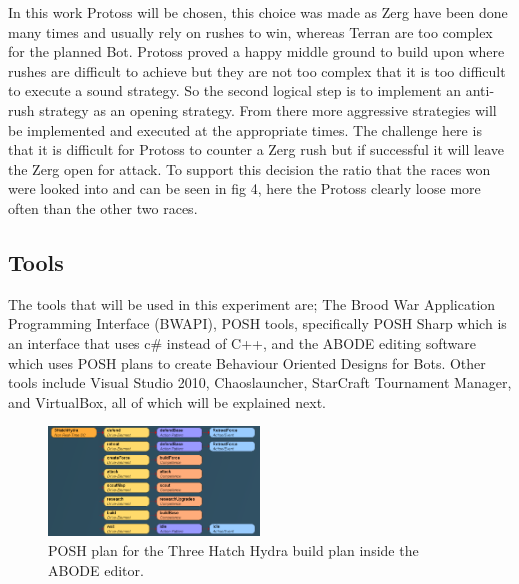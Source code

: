 \documentclass[journal]{IEEEtran}
\begin{document}
In this work Protoss will be chosen, this choice was made as Zerg have been done many times and usually rely on rushes to win, whereas Terran are too complex for the planned Bot. Protoss proved a happy middle ground to build upon where rushes are difficult to achieve but they are not too complex that it is too difficult to execute a sound strategy. So the second logical step is to implement an anti-rush strategy as an opening strategy. From there more aggressive strategies will be implemented and executed at the appropriate times. The challenge here is that it is difficult for Protoss to counter a Zerg rush but if successful it will leave the Zerg open for attack. To support this decision the ratio that the races won were looked into and can be seen in fig 4, here the Protoss clearly loose more often than the other two races.

\subsection{Tools}
The tools that will be used in this experiment are; The Brood War Application Programming Interface (BWAPI), POSH tools, specifically POSH Sharp which is an interface that uses c\# instead of C++, and the ABODE editing software which uses POSH plans to create Behaviour Oriented Designs for Bots. Other tools include Visual Studio 2010, Chaoslauncher, StarCraft Tournament Manager, and VirtualBox, all of which will be explained next. 


\begin{figure}[H]
	\centering
	\includegraphics[width=0.5\textwidth]{POSH}
	\caption{POSH plan for the Three Hatch Hydra build plan inside the ABODE editor.}
	\label{Fig1}
\end{figure}
\end{document}
